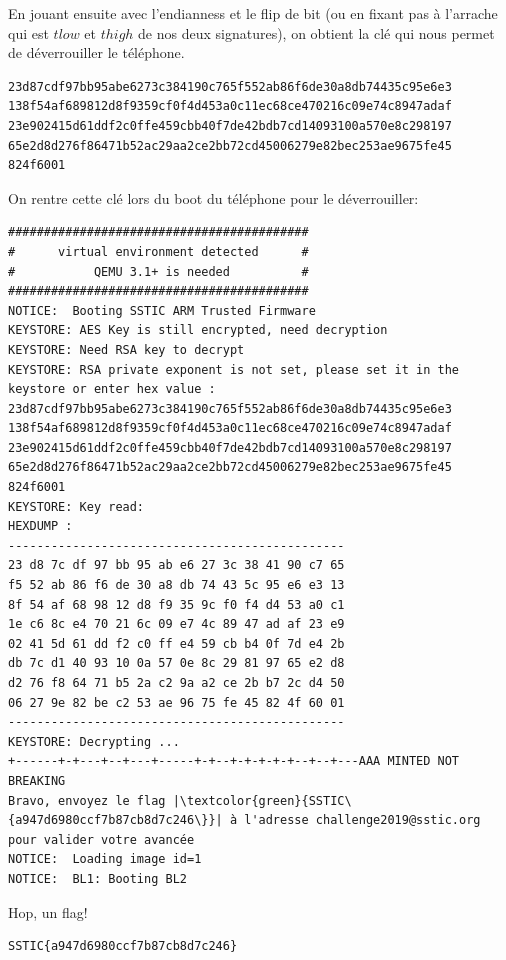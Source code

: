 \documentclass[14pt]{article}
\theoremstyle{definition}
\begin{document}
En jouant ensuite avec l'endianness et le flip de bit (ou en fixant pas à l'arrache qui est $tlow$ et $thigh$ de nos deux signatures), on obtient la clé qui nous permet de déverrouiller le téléphone.

\begin{verbatim}
23d87cdf97bb95abe6273c384190c765f552ab86f6de30a8db74435c95e6e3
138f54af689812d8f9359cf0f4d453a0c11ec68ce470216c09e74c8947adaf
23e902415d61ddf2c0ffe459cbb40f7de42bdb7cd14093100a570e8c298197
65e2d8d276f86471b52ac29aa2ce2bb72cd45006279e82bec253ae9675fe45
824f6001
\end{verbatim}


On rentre cette clé lors du boot du téléphone pour le déverrouiller:

\begin{verbatim}
##########################################
#      virtual environment detected      #
#           QEMU 3.1+ is needed          #
##########################################
NOTICE:  Booting SSTIC ARM Trusted Firmware
KEYSTORE: AES Key is still encrypted, need decryption
KEYSTORE: Need RSA key to decrypt
KEYSTORE: RSA private exponent is not set, please set it in the keystore or enter hex value :
23d87cdf97bb95abe6273c384190c765f552ab86f6de30a8db74435c95e6e3
138f54af689812d8f9359cf0f4d453a0c11ec68ce470216c09e74c8947adaf
23e902415d61ddf2c0ffe459cbb40f7de42bdb7cd14093100a570e8c298197
65e2d8d276f86471b52ac29aa2ce2bb72cd45006279e82bec253ae9675fe45
824f6001
KEYSTORE: Key read:
HEXDUMP :
-----------------------------------------------
23 d8 7c df 97 bb 95 ab e6 27 3c 38 41 90 c7 65
f5 52 ab 86 f6 de 30 a8 db 74 43 5c 95 e6 e3 13
8f 54 af 68 98 12 d8 f9 35 9c f0 f4 d4 53 a0 c1
1e c6 8c e4 70 21 6c 09 e7 4c 89 47 ad af 23 e9
02 41 5d 61 dd f2 c0 ff e4 59 cb b4 0f 7d e4 2b
db 7c d1 40 93 10 0a 57 0e 8c 29 81 97 65 e2 d8
d2 76 f8 64 71 b5 2a c2 9a a2 ce 2b b7 2c d4 50
06 27 9e 82 be c2 53 ae 96 75 fe 45 82 4f 60 01
-----------------------------------------------
KEYSTORE: Decrypting ...
+------+-+---+--+---+-----+-+--+-+-+-+-+--+--+---AAA MINTED NOT BREAKING
Bravo, envoyez le flag |\textcolor{green}{SSTIC\{a947d6980ccf7b87cb8d7c246\}}| à l'adresse challenge2019@sstic.org pour valider votre avancée
NOTICE:  Loading image id=1
NOTICE:  BL1: Booting BL2
\end{verbatim}


Hop, un flag!
\begin{verbatim}
SSTIC{a947d6980ccf7b87cb8d7c246}
\end{verbatim}
\end{document}

